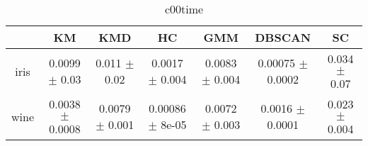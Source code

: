 \begin{table}
\centering
\begin{tabular}{ccccccc}
\toprule
 & KM & KMD & HC & GMM & DBSCAN & SC \\
\midrule
iris & 0.0099 $\pm$ 0.03 & 0.011 $\pm$ 0.02 & 0.0017 $\pm$ 0.004 & 0.0083 $\pm$ 0.004 & 0.00075 $\pm$ 0.0002 & 0.034 $\pm$ 0.07 \\
wine & 0.0038 $\pm$ 0.0008 & 0.0079 $\pm$ 0.001 & 0.00086 $\pm$ 8e-05 & 0.0072 $\pm$ 0.003 & 0.0016 $\pm$ 0.0001 & 0.023 $\pm$ 0.004 \\
\bottomrule
\end{tabular}
\caption{c00time}
\label{table:c00time}
\end{table}
